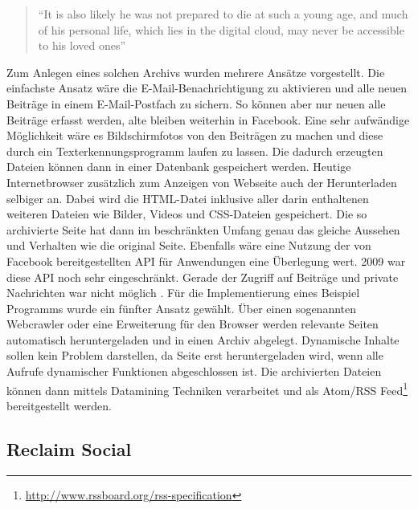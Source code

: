 \begin{quote}
    \enquote{It is also likely he was not prepared to die at such a young age, and much of his personal life, which lies in the digital \grqq cloud\grqq, may never be accessible to his loved ones}
    \cite[S.\,251]{McCown2009}
\end{quote}

Zum Anlegen eines solchen Archivs wurden mehrere Ansätze vorgestellt. Die einfachste Ansatz wäre die E-Mail-Benachrichtigung zu aktivieren und alle neuen Beiträge in einem E-Mail-Postfach zu sichern. So können aber nur neuen alle Beiträge erfasst werden, alte bleiben weiterhin in Facebook. Eine sehr aufwändige Möglichkeit wäre es Bildschirmfotos von den Beiträgen zu machen und diese durch ein Texterkennungsprogramm laufen zu lassen. Die dadurch erzeugten Dateien können dann in einer Datenbank gespeichert werden. Heutige Internetbrowser zusätzlich zum Anzeigen von Webseite auch der Herunterladen selbiger an. Dabei wird die HTML-Datei inklusive aller darin enthaltenen weiteren Dateien wie Bilder, Videos und CSS-Dateien gespeichert. Die so archivierte Seite hat dann im beschränkten Umfang genau das gleiche Aussehen und Verhalten wie die original Seite. Ebenfalls wäre eine Nutzung der von Facebook bereitgestellten API für Anwendungen eine Überlegung wert. 2009 war diese API noch sehr eingeschränkt. Gerade der Zugriff auf Beiträge und private Nachrichten war nicht möglich \cite[S.\,253, Table 1]{McCown2009}. Für die Implementierung eines Beispiel Programms wurde ein fünfter Ansatz gewählt. Über einen sogenannten Webcrawler oder eine Erweiterung für den Browser werden relevante Seiten automatisch heruntergeladen und in einen Archiv abgelegt. Dynamische Inhalte sollen kein Problem darstellen, da Seite erst heruntergeladen wird, wenn alle Aufrufe dynamischer Funktionen abgeschlossen ist. Die archivierten Dateien können dann mittels Datamining Techniken verarbeitet und als Atom/RSS Feed\footnote{\url{http://www.rssboard.org/rss-specification}} bereitgestellt werden. 


\subsection{Reclaim Social} %
\label{sub:reclaim_social}

